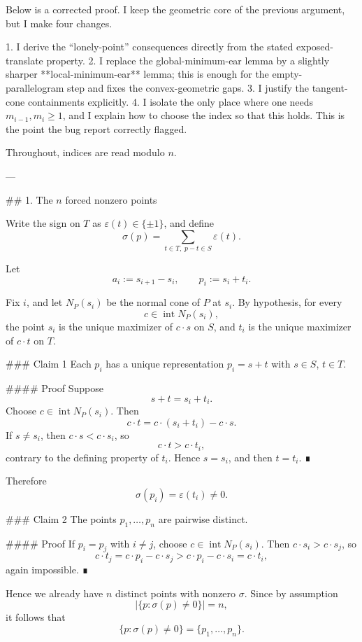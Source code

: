 Below is a corrected proof. I keep the geometric core of the previous argument, but I make four changes.

1. I derive the “lonely-point” consequences directly from the stated exposed-translate property.
2. I replace the global-minimum-ear lemma by a slightly sharper **local-minimum-ear** lemma; this is enough for the empty-parallelogram step and fixes the convex-geometric gaps.
3. I justify the tangent-cone containments explicitly.
4. I isolate the only place where one needs \(m_{i-1},m_i\ge 1\), and I explain how to choose the index so that this holds. This is the point the bug report correctly flagged.

Throughout, indices are read modulo \(n\).

---

## 1. The \(n\) forced nonzero points

Write the sign on \(T\) as \(\varepsilon(t)\in\{\pm 1\}\), and define
\[
\sigma(p)=\sum_{t\in T,\;p-t\in S}\varepsilon(t).
\]

Let
\[
a_i:=s_{i+1}-s_i,\qquad p_i:=s_i+t_i.
\]

Fix \(i\), and let \(N_P(s_i)\) be the normal cone of \(P\) at \(s_i\). By hypothesis, for every
\[
c\in \operatorname{int} N_P(s_i),
\]
the point \(s_i\) is the unique maximizer of \(c\cdot s\) on \(S\), and \(t_i\) is the unique maximizer of \(c\cdot t\) on \(T\).

### Claim 1
Each \(p_i\) has a unique representation \(p_i=s+t\) with \(s\in S\), \(t\in T\).

#### Proof
Suppose
\[
s+t=s_i+t_i.
\]
Choose \(c\in \operatorname{int}N_P(s_i)\). Then
\[
c\cdot t = c\cdot(s_i+t_i)-c\cdot s.
\]
If \(s\neq s_i\), then \(c\cdot s<c\cdot s_i\), so
\[
c\cdot t>c\cdot t_i,
\]
contrary to the defining property of \(t_i\). Hence \(s=s_i\), and then \(t=t_i\). ∎

Therefore
\[
\sigma(p_i)=\varepsilon(t_i)\neq 0.
\]

### Claim 2
The points \(p_1,\dots,p_n\) are pairwise distinct.

#### Proof
If \(p_i=p_j\) with \(i\neq j\), choose \(c\in \operatorname{int}N_P(s_i)\). Then \(c\cdot s_i>c\cdot s_j\), so
\[
c\cdot t_j
= c\cdot p_i-c\cdot s_j
> c\cdot p_i-c\cdot s_i
= c\cdot t_i,
\]
again impossible. ∎

Hence we already have \(n\) distinct points with nonzero \(\sigma\). Since by assumption
\[
\bigl|\{p:\sigma(p)\neq 0\}\bigr|=n,
\]
it follows that
\[
\{p:\sigma(p)\neq 0\}=\{p_1,\dots,p_n\}.
\]

